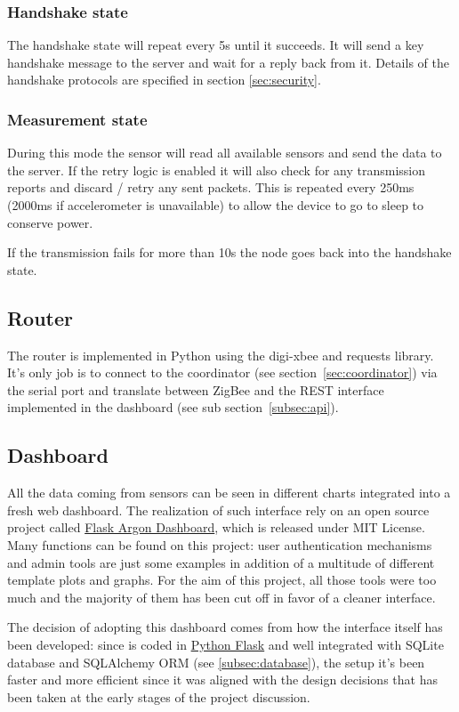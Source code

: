 \documentclass[a4paper,11pt]{scrartcl}
\begin{document}
\subsubsection*{Handshake state}
The handshake state will repeat every 5s until it succeeds. It will send a key handshake message to the server and wait for a reply back from it. Details of the handshake protocols are specified in section \ref{sec:security}.

\subsubsection*{Measurement state}
During this mode the sensor will read all available sensors and send the data to the server. If the retry logic is enabled it will also check for any transmission reports and discard / retry any sent packets. This is repeated every 250ms (2000ms if accelerometer is unavailable) to allow the device to go to sleep to conserve power.

If the transmission fails for more than 10s the node goes back into the handshake state.

\subsection{Router}\label{subsec:router}
The router is implemented in Python using the digi-xbee and requests library. It's only job is to connect to the coordinator (see section~\ref{sec:coordinator}) via the serial port and translate between ZigBee and the REST interface implemented in the dashboard (see sub section~\ref{subsec:api}).

\subsection{Dashboard}
All the data coming from sensors can be seen in different charts integrated into a fresh web dashboard. The realization of such interface rely on an open source project called \href{https://github.com/app-generator/flask-argon-dashboard}{Flask Argon Dashboard}, which is released under MIT License. Many functions can be found on this project: user authentication mechanisms and admin tools are just some examples in addition of a multitude of different template plots and graphs. For the aim of this project, all those tools were too much and the majority of them has been cut off in favor of a cleaner interface.

The decision of adopting this dashboard comes from how the interface itself has been developed: since is coded in \href{https://palletsprojects.com/p/flask/}{Python Flask} and well integrated with SQLite database and SQLAlchemy ORM (see \ref{subsec:database}), the setup it's been faster and more efficient since it was aligned with the design decisions that has been taken at the early stages of the project discussion.
\end{document}
